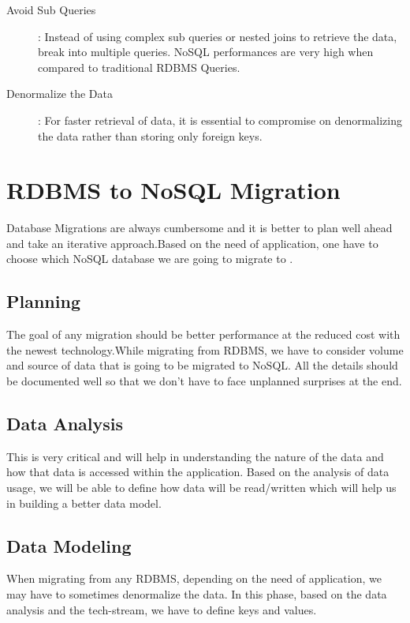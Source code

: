 \documentclass[sigconf]{acmart}
\begin{document}
\begin{description}
    \item[Avoid Sub Queries]: Instead of using complex sub queries or nested joins to retrieve the data, break into multiple queries. NoSQL performances are very high when compared to traditional RDBMS Queries.
    \item[Denormalize the Data]: For faster retrieval of data, it is essential to compromise on denormalizing the data rather than storing only foreign keys.
    
\end{description}

\section{RDBMS to NoSQL Migration}

Database Migrations are always cumbersome and it is better to plan well ahead and take an iterative approach.Based on the need of application, one have to choose which NoSQL database we are going to migrate to  \cite{aws}.

\subsection{Planning}  

The goal of any migration should be better performance at the reduced cost with the newest technology.While migrating from RDBMS, we have to consider volume and source of data that is going to be migrated to NoSQL. All the details should be documented well so that we don't have to face unplanned surprises at the end.

\subsection{Data Analysis} 

This is very critical and will help in understanding the nature of the data and how that data is accessed within the application. Based on the analysis of data usage, we will be able to define how data will be read/written which will help us in building a better data model.

\subsection{Data Modeling} 

When migrating from any RDBMS, depending on the need of application, we may have to sometimes denormalize the data. In this phase, based on the data analysis and the tech-stream, we have to define keys and values.
\end{document}
